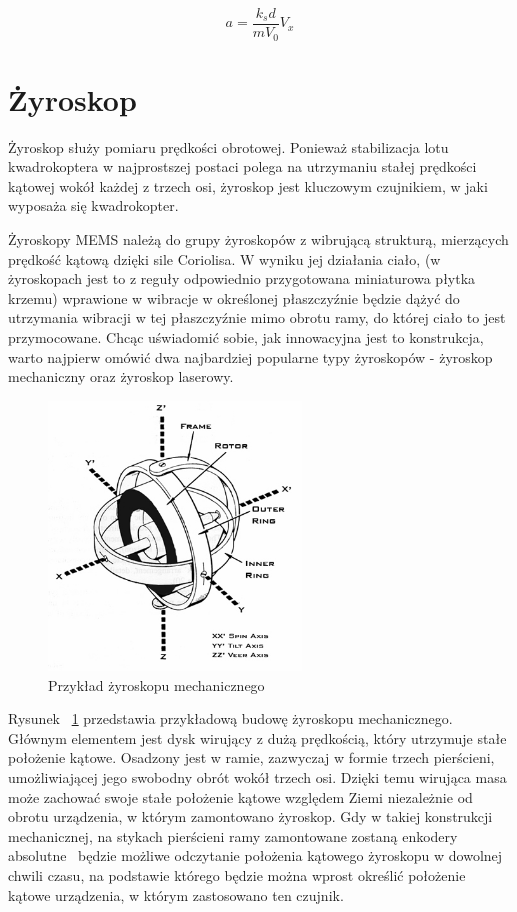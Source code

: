 \begin{equation}
	a = \frac{k{_s}d}{mV_0}V_x
\end{equation}

\section{Żyroskop}

Żyroskop służy pomiaru prędkości obrotowej. Ponieważ stabilizacja lotu kwadrokoptera w najprostszej postaci polega na utrzymaniu stałej prędkości kątowej wokół każdej z trzech osi, żyroskop jest kluczowym czujnikiem, w jaki wyposaża się kwadrokopter\cite{quadro9, quadro16}. 

Żyroskopy MEMS należą do grupy żyroskopów z wibrującą strukturą, mierzących prędkość kątową dzięki sile Coriolisa. W wyniku jej działania ciało, (w żyroskopach jest to z reguły odpowiednio przygotowana miniaturowa płytka krzemu) wprawione w wibracje w określonej płaszczyźnie będzie dążyć do utrzymania wibracji w tej płaszczyźnie mimo obrotu ramy, do której ciało to jest przymocowane. Chcąc uświadomić sobie, jak innowacyjna jest to konstrukcja, warto najpierw omówić dwa najbardziej popularne typy żyroskopów - żyroskop mechaniczny oraz żyroskop laserowy.

\begin{figure}[H]
	\centering
	\includegraphics[width=0.6\textwidth]{Pictures/Gyroscope_Theory.jpg}
	\caption[Przykład żyroskopu mechanicznego]{Przykład żyroskopu mechanicznego~\cite{mems10}}
	\label{fig:Gyroscope_Theory}
\end{figure}

Rysunek ~\ref{fig:Gyroscope_Theory} przedstawia przykładową budowę żyroskopu mechanicznego. Głównym elementem jest dysk wirujący z dużą prędkością, który utrzymuje stałe położenie kątowe. Osadzony jest w ramie, zazwyczaj w formie trzech pierścieni, umożliwiającej jego swobodny obrót wokół trzech osi. Dzięki temu wirująca masa może zachować swoje stałe położenie kątowe względem Ziemi niezależnie od obrotu urządzenia, w którym zamontowano żyroskop. Gdy w takiej konstrukcji mechanicznej, na stykach pierścieni ramy zamontowane zostaną enkodery absolutne~\cite{mems11} będzie możliwe odczytanie położenia kątowego żyroskopu w dowolnej chwili czasu, na podstawie którego będzie można wprost określić położenie kątowe urządzenia, w którym zastosowano ten czujnik. 

